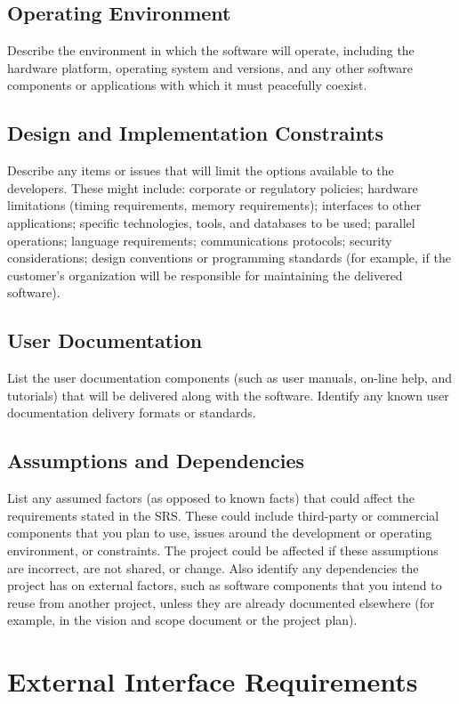 \subsection*{Operating Environment}
Describe the environment in which the software will operate, including the hardware platform, operating system and versions, and any other software components or applications with which it must peacefully coexist.

\subsection*{Design and Implementation Constraints}
Describe any items or issues that will limit the options available to the developers. These might include: corporate or regulatory policies; hardware limitations (timing requirements, memory requirements); interfaces to other applications; specific technologies, tools, and databases to be used; parallel operations; language requirements; communications protocols; security considerations; design conventions or programming standards (for example, if the customer’s organization will be responsible for maintaining the delivered software).

\subsection*{User Documentation}
List the user documentation components (such as user manuals, on-line help, and tutorials) that will be delivered along with the software. Identify any known user documentation delivery formats or standards.

\subsection*{Assumptions and Dependencies}
List any assumed factors (as opposed to known facts) that could affect the requirements stated in the SRS. These could include third-party or commercial components that you plan to use, issues around the development or operating environment, or constraints. The project could be affected if these assumptions are incorrect, are not shared, or change. Also identify any dependencies the project has on external factors, such as software components that you intend to reuse from another project, unless they are already documented elsewhere (for example, in the vision and scope document or the project plan).

\section{External Interface Requirements}
